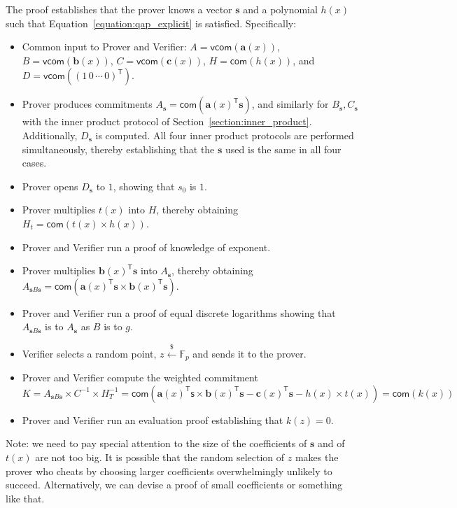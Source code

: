 \documentclass{article}
\theoremstyle{definition}
\begin{document}
The proof establishes that the prover knows a vector $\mathbf{s}$ and a polynomial $h(x)$ such that Equation~\ref{equation:qap_explicit} is satisfied. Specifically:
\begin{itemize}
    \item Common input to Prover and Verifier: $A = \mathsf{vcom}(\mathbf{a}(x))$, $B = \mathsf{vcom}(\mathbf{b}(x))$, $C = \mathsf{vcom}(\mathbf{c}(x))$, $H = \mathsf{com}(h(x))$, and $D = \mathsf{vcom}((1 \, 0 \, \cdots \, 0)^\mathsf{T})$.
    \item Prover produces commitments $A_\mathbf{s} = \mathsf{com}(\mathbf{a}(x)^\mathsf{T} \mathbf{s})$, and similarly for $B_\mathbf{s}, C_\mathbf{s}$ with the inner product protocol of Section~\ref{section:inner_product}. Additionally, $D_\mathbf{s}$ is computed. All four inner product protocols are performed simultaneously, thereby establishing that the $\mathbf{s}$ used is the same in all four cases.
    \item Prover opens $D_\mathbf{s}$ to $1$, showing that $s_0$ is $1$.
    \item Prover multiplies $t(x)$ into $H$, thereby obtaining $H_t = \mathsf{com}(t(x) \times h(x))$.
    \item Prover and Verifier run a proof of knowledge of exponent.
    \item Prover multiplies $\mathbf{b}(x)^\mathsf{T} \mathbf{s}$ into $A_\mathbf{s}$, thereby obtaining $A_{\mathbf{s}B\mathbf{s}} = \mathsf{com}(\mathbf{a}(x)^\mathsf{T} \mathbf{s} \times \mathbf{b}(x)^\mathsf{T} \mathbf{s})$.
    \item Prover and Verifier run a proof of equal discrete logarithms showing that $A_{\mathbf{s}B\mathbf{s}}$ is to $A_\mathbf{s}$ as $B$ is to $g$.
    \item Verifier selects a random point, $z \xleftarrow{\$} \mathbb{F}_p$ and sends it to the prover.
    \item Prover and Verifier compute the weighted commitment $K = A_{\mathbf{s}B\mathbf{s}} \times C^{-1} \times H_T^{-1} = \mathsf{com}(\mathbf{a}(x)^\mathsf{T} \mathsf{s} \times \mathbf{b}(x)^\mathsf{T} \mathbf{s} - \mathbf{c}(x)^\mathsf{T} \mathbf{s} - h(x) \times t(x)) = \mathsf{com}(k(x))$
    \item Prover and Verifier run an evaluation proof establishing that $k(z) = 0$.
\end{itemize}

Note: we need to pay special attention to the size of the coefficients of $\mathbf{s}$ and of $t(x)$ are not too big. It is possible that the random selection of $z$ makes the prover who cheats by choosing larger coefficients overwhelmingly unlikely to succeed. Alternatively, we can devise a proof of small coefficients or something like that.
\end{document}
